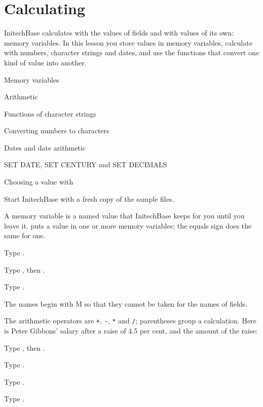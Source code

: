 \chapter{Calculating}
InitechBase calculates with the values of fields and with values of its own:
memory variables.  In this lesson you store values in memory variables,
calculate with numbers, character strings and dates, and use the functions
that convert one kind of value into another.

\begin{ChapterCovers}
\item Memory variables
\item Arithmetic
\item Functions of character strings
\item Converting numbers to characters
\item Dates and date arithmetic
\item SET DATE, SET CENTURY and SET DECIMALS
\item Choosing a value with 
\end{ChapterCovers}

Start InitechBase with a fresh copy of the sample files.

A memory variable is a named value that InitechBase keeps for you until you
leave it.   puts a value in one or more memory variables; the
equals sign does the same for one.
\begin{Steps}
\item Type .
\item Type , then .
\item Type .
\end{Steps}
The names begin with M so that they cannot be taken for the names of fields.

The arithmetic operators are \texttt{+}, \texttt{-}, \texttt{*} and \texttt{/};
parentheses group a calculation.  Here is Peter Gibbons' salary after a raise
of 4.5 per cent, and the amount of the raise:
\begin{Steps}[resume]
\item Type , then .
\item Type .
\item Type .
\item Type .
\end{Steps}

